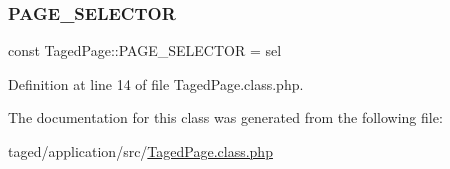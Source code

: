 \mbox{\label{class_taged_page_a59afec55d391b3bd42161255c7e8358f}} 
\subsubsection{\texorpdfstring{P\+A\+G\+E\+\_\+\+S\+E\+L\+E\+C\+T\+OR}{PAGE\_SELECTOR}}
{\footnotesize\ttfamily const Taged\+Page\+::\+P\+A\+G\+E\+\_\+\+S\+E\+L\+E\+C\+T\+OR = \textquotesingle{}sel\textquotesingle{}}



Definition at line 14 of file Taged\+Page.\+class.\+php.



The documentation for this class was generated from the following file\+:\begin{DoxyCompactItemize}
\item 
taged/application/src/\hyperlink{_taged_page_8class_8php}{Taged\+Page.\+class.\+php}\end{DoxyCompactItemize}
